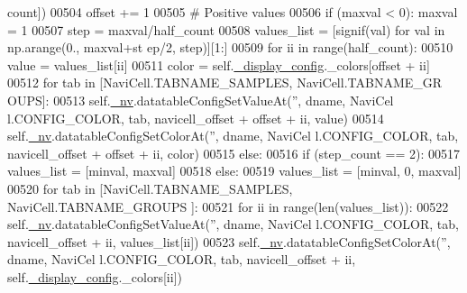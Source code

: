 \begin{DoxyCode}
      count])
00504                         offset += 1
00505                     \textcolor{comment}{# Positive values}
00506                     \textcolor{keywordflow}{if} (maxval < 0): maxval = 1
00507                     step = maxval/half\_count
00508                     values\_list = [signif(val) \textcolor{keywordflow}{for} val \textcolor{keywordflow}{in} np.arange(0., maxval+st
      ep/2, step)][1:]
00509                     \textcolor{keywordflow}{for} ii \textcolor{keywordflow}{in} range(half\_count):
00510                         value = values\_list[ii]
00511                         color = self.\hyperlink{classnavicom_1_1navicom_1_1NaviCom_ab8ddca454f674629472d8bfec46ac76f}{_display_config}.\_colors[offset + ii]
00512                         \textcolor{keywordflow}{for} tab \textcolor{keywordflow}{in} [NaviCell.TABNAME\_SAMPLES, NaviCell.TABNAME\_GR
      OUPS]:
00513                             self.\hyperlink{classnavicom_1_1navicom_1_1NaviCom_afff3fd56fa16a68bab52ba8d801e325a}{_nv}.datatableConfigSetValueAt(\textcolor{stringliteral}{''}, dname, NaviCel
      l.CONFIG\_COLOR, tab, navicell\_offset + offset + ii, value)
00514                             self.\hyperlink{classnavicom_1_1navicom_1_1NaviCom_afff3fd56fa16a68bab52ba8d801e325a}{_nv}.datatableConfigSetColorAt(\textcolor{stringliteral}{''}, dname, NaviCel
      l.CONFIG\_COLOR, tab, navicell\_offset + offset + ii, color)
00515                 \textcolor{keywordflow}{else}:
00516                     \textcolor{keywordflow}{if} (step\_count == 2):
00517                         values\_list = [minval, maxval]
00518                     \textcolor{keywordflow}{else}:
00519                         values\_list = [minval, 0, maxval]
00520                     \textcolor{keywordflow}{for} tab \textcolor{keywordflow}{in} [NaviCell.TABNAME\_SAMPLES, NaviCell.TABNAME\_GROUPS
      ]:
00521                         \textcolor{keywordflow}{for} ii \textcolor{keywordflow}{in} range(len(values\_list)):
00522                             self.\hyperlink{classnavicom_1_1navicom_1_1NaviCom_afff3fd56fa16a68bab52ba8d801e325a}{_nv}.datatableConfigSetValueAt(\textcolor{stringliteral}{''}, dname, NaviCel
      l.CONFIG\_COLOR, tab, navicell\_offset + ii, values\_list[ii])
00523                             self.\hyperlink{classnavicom_1_1navicom_1_1NaviCom_afff3fd56fa16a68bab52ba8d801e325a}{_nv}.datatableConfigSetColorAt(\textcolor{stringliteral}{''}, dname, NaviCel
      l.CONFIG\_COLOR, tab, navicell\_offset + ii, self.\hyperlink{classnavicom_1_1navicom_1_1NaviCom_ab8ddca454f674629472d8bfec46ac76f}{_display_config}.\_colors[ii])

\end{DoxyCode}
